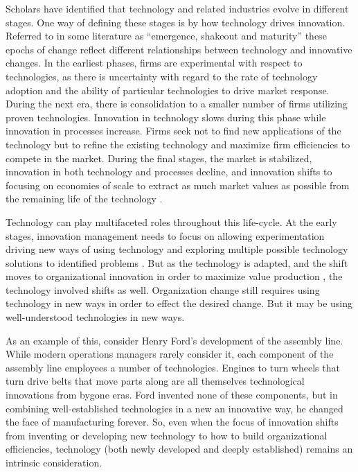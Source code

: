 \documentclass[man]{apa7}
\begin{document}
Scholars have identified that technology and related industries evolve in different stages. One way of defining these stages is by how technology drives innovation. Referred to in some literature as ``emergence, shakeout and maturity'' these epochs of change reflect different relationships between technology and innovative changes. In the earliest phases, firms are experimental with respect to technologies, as there is uncertainty with regard to the rate of technology adoption and the ability of particular technologies to drive market response. During the next era, there is consolidation to a smaller number of firms utilizing proven technologies. Innovation in technology slows during this phase while innovation in processes increase. Firms seek not to find new applications of the technology but to refine the existing technology and maximize firm efficiencies to compete in the market. During the final stages, the market is stabilized, innovation in both technology and processes decline, and innovation shifts to focusing on economies of scale to extract as much market values as possible from the remaining life of the technology \parencite{shaneHandbookTechnologyInnovation2009}.

Technology can play multifaceted roles throughout this life-cycle. At the early stages, innovation management needs to focus on allowing experimentation driving new ways of using technology and exploring multiple possible technology solutions to identified problems \parencite{drakemanRiskDeRiskingInnovation2020}. But as the technology is adapted, and the shift moves to organizational innovation in order to maximize value production \parencite{volberdaManagementInnovationManagement2013}, the technology involved shifts as well. Organization change still requires using technology in new ways in order to effect the desired change. But it may be using well-understood technologies in new ways.

As an example of this, consider Henry Ford's development of the assembly line. While modern operations managers rarely consider it, each component of the assembly line employees a number of technologies. Engines to turn wheels that turn drive belts that move parts along are all themselves technological innovations from bygone eras. Ford invented none of these components, but in combining well-established technologies in a new an innovative way, he changed the face of manufacturing forever. So, even when the focus of innovation shifts from inventing or developing new technology to how to build organizational efficiencies, technology (both newly developed and deeply established) remains an intrinsic consideration.

\printbibliography
\end{document}
